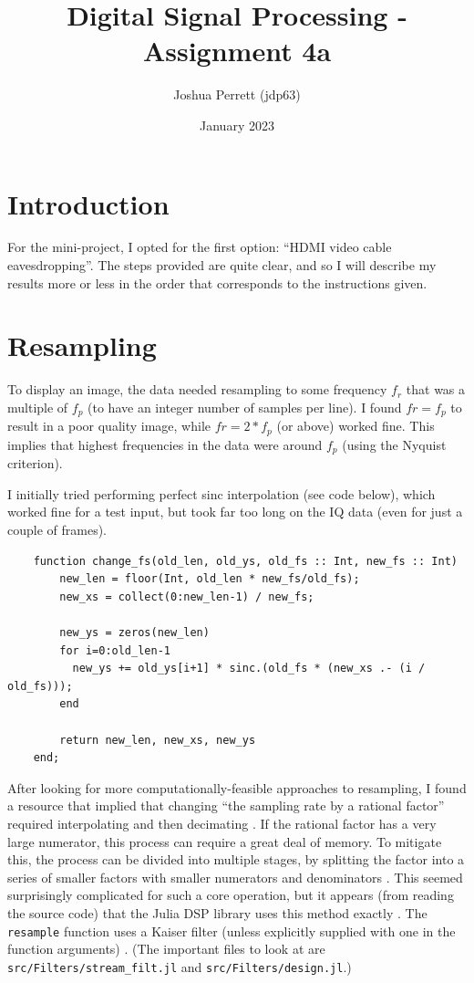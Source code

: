 \documentclass{article}
\title{Digital Signal Processing - Assignment 4a}
\author{Joshua Perrett (jdp63)}
\date{January 2023}
\newcommand*{\mono}[1]{\texttt{#1}}
\newcommand*{\code}[1]{\texttt{#1}}
\begin{document}
\maketitle

\section*{Introduction}

For the mini-project, I opted for the first option: ``HDMI video cable eavesdropping''. The steps provided are quite clear, and so I will describe my results more or less in the order that corresponds to the instructions given.

\section*{Resampling}

To display an image, the data needed resampling to some frequency $f_r$ that was a multiple of $f_p$ (to have an integer number of samples per line). I found $fr = f_p$ to result in a poor quality image, while $fr = 2 * f_p$ (or above) worked fine. This implies that highest frequencies in the data were around $f_p$ (using the Nyquist criterion).

I initially tried performing perfect sinc interpolation (see code below), which worked fine for a test input, but took far too long on the IQ data (even for just a couple of frames).

\begin{verbatim}
    function change_fs(old_len, old_ys, old_fs :: Int, new_fs :: Int)
        new_len = floor(Int, old_len * new_fs/old_fs);
        new_xs = collect(0:new_len-1) / new_fs;

        new_ys = zeros(new_len)
        for i=0:old_len-1
          new_ys += old_ys[i+1] * sinc.(old_fs * (new_xs .- (i / old_fs)));
        end

        return new_len, new_xs, new_ys
    end;
\end{verbatim}


After looking for more computationally-feasible approaches to resampling, I found a resource that implied that changing ``the sampling rate by a rational factor'' required interpolating and then decimating \cite{dspguru-resampling}. If the rational factor has a very large numerator, this process can require a great deal of memory. To mitigate this, the process can be divided into multiple stages, by splitting the factor into a series of smaller factors with smaller numerators and denominators \cite{dspguru-resampling}. This seemed surprisingly complicated for such a core operation, but it appears (from reading the source code) that the Julia DSP library uses this method exactly \cite{dsp-julia-github}. The \code{resample} function uses a Kaiser filter (unless explicitly supplied with one in the function arguments) \cite{dsp-julia-github}. (The important files to look at are \code{src/Filters/stream_filt.jl} and \mono{src/Filters/design.jl}.)
\end{document}
